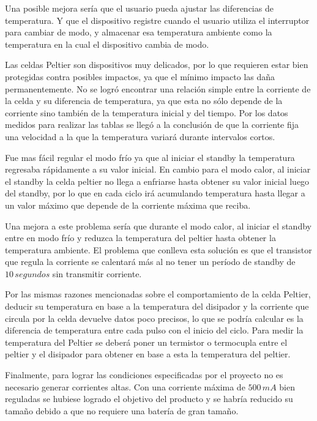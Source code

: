 \documentclass[10pt,spanish,a4paper,openany,notitlepage]{article}
\begin{document}
Una posible mejora sería que el usuario pueda ajustar las diferencias
de temperatura. Y que el dispositivo registre cuando el usuario utiliza
el interruptor para cambiar de modo, y almacenar esa temperatura ambiente
como la temperatura en la cual el dispositivo cambia de modo.

Las celdas Peltier son dispositivos muy delicados, por lo que requieren
estar bien protegidas contra posibles impactos, ya que el mínimo impacto
las daña permanentemente. 
No se logró encontrar una relación simple entre la corriente de la celda
y su diferencia de temperatura, ya que esta no sólo depende de la corriente
sino también de la temperatura inicial y del tiempo. Por los datos medidos para realizar
las tablas se llegó a la conclusión de que la corriente fija una velocidad
a la que la temperatura variará durante intervalos cortos.

Fue mas fácil regular el modo frío ya que al iniciar el standby la
temperatura regresaba rápidamente a su valor inicial. En cambio para el
modo calor, al iniciar el standby la celda peltier no llega a enfriarse
hasta obtener su valor inicial luego del standby, por lo que en cada ciclo
irá acumulando temperatura hasta llegar a un valor máximo que depende
de la corriente máxima que reciba.

Una mejora a este problema sería que durante el modo calor, al iniciar
el standby entre en modo frío y reduzca la temperatura del peltier hasta
obtener la temperatura ambiente. El problema que conlleva esta solución
es que el transistor que regula la corriente se calentará más al no tener
un período de standby de $10\, \unit{segundos}$ sin transmitir corriente.

Por las mismas razones mencionadas sobre el comportamiento de la celda Peltier,
deducir su temperatura en base a la temperatura del disipador y la corriente
que circula por la celda devuelve datos poco precisos, lo que se podría calcular
es la diferencia de temperatura entre cada pulso con el inicio del ciclo.
Para medir la temperatura del Peltier se deberá poner un termistor o termocupla
entre el peltier y el disipador para obtener en base a esta la temperatura del
peltier.

Finalmente, para lograr las condiciones especificadas por el proyecto
no es necesario generar corrientes altas. Con una corriente máxima de
$500\, \unit{mA}$ bien reguladas se hubiese logrado el objetivo del producto
y se habría reducido su tamaño debido a que no requiere una batería de
gran tamaño.
\end{document}
